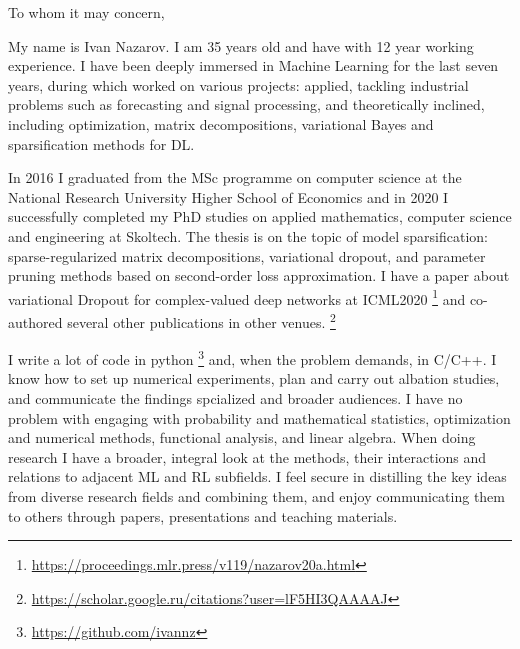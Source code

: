 \documentclass[14pt]{letter}
\begin{document}
\thispagestyle{empty}

%

\vspace{1.5cm}

\begin{minipage}{0.5\linewidth}
To whom it may concern, \par
\end{minipage} \par\bigskip

My name is Ivan Nazarov. I am 35 years old and have with 12 year working experience. I have
been deeply immersed in Machine Learning for the last seven years, during which worked on
various projects: applied, tackling industrial problems such as forecasting and signal processing,
and theoretically inclined, including optimization, matrix decompositions, variational Bayes
and sparsification methods for DL. \par\medskip

In 2016 I graduated from the MSc programme on computer science at the National Research
University Higher School of Economics and in 2020 I successfully completed my PhD studies
on applied mathematics, computer science and engineering at Skoltech. The thesis is on
the topic of model sparsification: sparse-regularized matrix decompositions, variational
dropout, and parameter pruning methods based on second-order loss approximation. I have
a paper about variational Dropout for complex-valued deep networks at ICML2020%
\footnote{
    \url{https://proceedings.mlr.press/v119/nazarov20a.html}
} and co-authored several other publications in other venues.%
\footnote{
    \url{https://scholar.google.ru/citations?user=lF5HI3QAAAAJ}
}
\par\medskip

I write a lot of code in python%
\footnote{
    \url{https://github.com/ivannz}
}
and, when the problem demands, in C/C++. I know how to set up numerical experiments, plan
and carry out albation studies, and communicate the findings spcialized and broader audiences.
I have no problem with engaging with probability and mathematical statistics, optimization and
numerical methods, functional analysis, and linear algebra. When doing research I have a broader,
integral look at the methods, their interactions and relations to adjacent ML and RL subfields.
I feel secure in distilling the key ideas from diverse research fields and combining them,
and enjoy communicating them to others through papers, presentations and teaching materials.
\par\medskip
\end{document}
